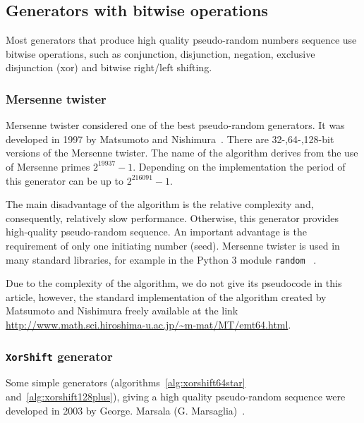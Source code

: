 \documentclass[%
floatfix,
showkeys,
nofootinbib, %
superscriptaddress, %
]{revtex4-1}
\begin{document}
\subsection{Generators with bitwise operations}
Most generators that produce high quality pseudo-random numbers
sequence use bitwise operations, such as conjunction, disjunction,
negation, exclusive disjunction (xor) and bitwise right/left shifting.

\subsubsection{Mersenne twister}

Mersenne twister considered one of the best pseudo-random
generators. It was developed in 1997 by Matsumoto and
Nishimura~\cite{L_Matsumoto:1998:MTE}. There are 32-,64-,128-bit
versions of the Mersenne twister. The name of the algorithm derives
from the use of Mersenne primes $2^{19937}-1$. Depending on the
implementation the period of this generator can be up to
$2^{216091}-1$.

The main disadvantage of the algorithm is the relative complexity and,
consequently, relatively slow performance. Otherwise, this generator
provides high-quality pseudo-random sequence. An important advantage
is the requirement of only one initiating number (seed). Mersenne
twister is used in many standard libraries, for example in the Python
3 module \texttt{random} ~\cite{L_Python3:3.5.1}.

Due to the complexity of the algorithm, we do not give its pseudocode
in this article, however, the standard implementation of the algorithm
created by Matsumoto and Nishimura freely available at the link
\url{http://www.math.sci.hiroshima-u.ac.jp/~m-mat/MT/emt64.html}.

\subsubsection{\texttt{XorShift} generator}
Some simple generators (algorithms~\ref{alg:xorshift64star}
and~\ref{alg:xorshift128plus}), giving a high quality pseudo-random
sequence were developed in 2003 by George. Marsala
(G. Marsaglia)~\cite{L_xorshift:2003, L_xorshift:2005}.
\end{document}
